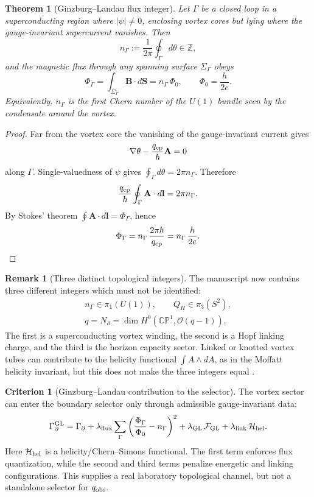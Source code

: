 \documentclass[aps,prd,reprint,nofootinbib,superscriptaddress,floatfix]{revtex4-2}
\numberwithin{equation}{section}
\theoremstyle{definition}
\newtheorem{criterion}{Criterion}[section]
\newtheorem{remark}{Remark}[section]
\theoremstyle{plain}
\newtheorem{theorem}{Theorem}[section]
\newcommand{\CP}{\mathbb{CP}}
\begin{document}
\begin{theorem}[Ginzburg--Landau flux integer]
\label{thm:gl-flux}
Let \(\Gamma\) be a closed loop in a superconducting region where
\(|\psi|\ne0\), enclosing vortex cores but lying where the gauge-invariant
supercurrent vanishes.  Then
\begin{equation}
n_\Gamma
:=
\frac{1}{2\pi}\oint_\Gamma d\theta
\in\mathbb Z,
\end{equation}
and the magnetic flux through any spanning surface \(\Sigma_\Gamma\) obeys
\begin{equation}
\boxed{
\Phi_\Gamma
=
\int_{\Sigma_\Gamma}\mathbf B\cdot d\mathbf S
=
n_\Gamma\,\Phi_0,
\qquad
\Phi_0=\frac{h}{2e}.
}
\end{equation}
Equivalently, \(n_\Gamma\) is the first Chern number of the \(U(1)\) bundle
seen by the condensate around the vortex.
\end{theorem}

\begin{proof}
Far from the vortex core the vanishing of the gauge-invariant current gives
\[
\nabla\theta-\frac{q_{\rm cp}}{\hbar}\mathbf A=0
\]
along \(\Gamma\).  Single-valuedness of \(\psi\) gives
\(\oint_\Gamma d\theta=2\pi n_\Gamma\).  Therefore
\[
\frac{q_{\rm cp}}{\hbar}\oint_\Gamma\mathbf A\cdot d\mathbf l
=
2\pi n_\Gamma .
\]
By Stokes' theorem \(\oint\mathbf A\cdot d\mathbf l=\Phi_\Gamma\), hence
\[
\Phi_\Gamma=n_\Gamma\,\frac{2\pi\hbar}{q_{\rm cp}}
=n_\Gamma\,\frac{h}{2e}.
\]
\end{proof}

\begin{remark}[Three distinct topological integers]
The manuscript now contains three different integers which must not be
identified:
\[
\begin{gathered}
n_\Gamma\in\pi_1(U(1)),
\qquad
Q_H\in\pi_3(S^2),
\\
q=N_\partial
=\dim H^0(\CP^1,\mathcal O(q-1)).
\end{gathered}
\]
The first is a superconducting vortex winding, the second is a Hopf linking
charge, and the third is the horizon capacity sector.  Linked or knotted
vortex tubes can contribute to the helicity functional
\(\int A\wedge dA\), as in the Moffatt helicity invariant, but this does not
make the three integers equal \cite{Moffatt1969}.
\end{remark}

\begin{criterion}[Ginzburg--Landau contribution to the selector]
The vortex sector can enter the boundary selector only through admissible
gauge-invariant data:
\begin{equation}
\Gamma_\partial^{\rm GL}
=
\Gamma_\partial
+
\lambda_{\rm flux}
\sum_{\Gamma}
\left(
\frac{\Phi_\Gamma}{\Phi_0}-n_\Gamma
\right)^2
+
\lambda_{\rm GL}\,\mathcal F_{\rm GL}
+
\lambda_{\rm link}\,\mathcal H_{\rm hel}.
\end{equation}
Here \(\mathcal H_{\rm hel}\) is a helicity/Chern--Simons functional.
The first term enforces flux quantization, while the second and third terms
penalize energetic and linking configurations.  This supplies a real
laboratory topological channel, but not a standalone selector for
\(q_{\rm obs}\).
\end{criterion}
\end{document}
